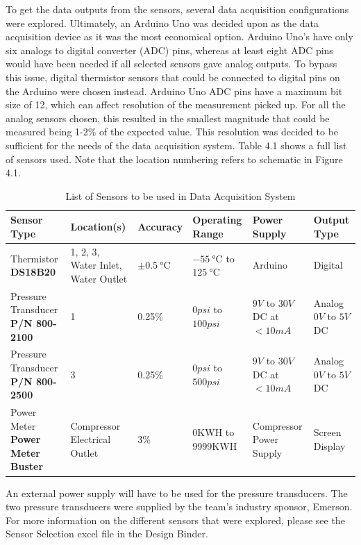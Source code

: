 \medskip
To get the data outputs from the sensors, several data acquisition configurations were explored. Ultimately, an Arduino Uno was decided upon as the data acquisition device as it was the most economical option. Arduino Uno’s have only six analogs to digital converter (ADC) pins, whereas at least eight ADC pins would have been needed if all selected sensors gave analog outputs. To bypass this issue, digital thermistor sensors that could be connected to digital pins on the Arduino were chosen instead. Arduino Uno ADC pins have a maximum bit size of 12, which can affect resolution of the measurement picked up. For all the analog sensors chosen, this resulted in the smallest magnitude that could be measured being 1-2\% of the expected value. This resolution was decided to be sufficient for the needs of the data acquisition system. Table 4.1 shows a full list of sensors used. Note that the location numbering refers to schematic in Figure 4.1.

\medskip
\begin{table}[H]
\centering
\caption{List of Sensors to be used in Data Acquisition System}
\begin{tabular}{|P{26mm}|P{26mm}|P{15mm}|P{27mm}|P{23mm}|P{20mm}|}
    \hline
    Sensor Type & Location(s) & Accuracy & Operating Range & Power Supply & Output Type \\
    \hline
    Thermistor \textbf{DS18B20} & 1, 2, 3, Water Inlet, Water Outlet        & $\pm \SI{0.5}{\celsius}$ & $\SI{-55}{\celsius}$ to $\SI{125}{\celsius}$ & Arduino  & Digital \\
    Pressure Transducer \textbf{P/N 800-2100}   & 1                            & 0.25\%                   & $0psi$ to $100psi$ & $9V$ to $30V$ DC at $<10mA$ & Analog $0V$ to $5V$ DC \\
    Pressure Transducer \textbf{P/N 800-2500}   & 3                            & 0.25\%                   & $0psi$ to $500psi$ & $9V$ to $30V$ DC at $<10mA$ & Analog $0V$ to $5V$ DC \\
    Power Meter \textbf{Power Meter Buster} \cite{power_meter}           & Compressor Electrical Outlet & 3\%                      & 0KWH to 9999KWH & Compressor Power Supply  & Screen Display \\
    \hline
\end{tabular}
\end{table}

\medskip
An external power supply will have to be used for the pressure transducers. The two pressure transducers were supplied by the team’s industry sponsor, Emerson. For more information on the different sensors that were explored, please see the Sensor Selection excel file in the Design Binder.

